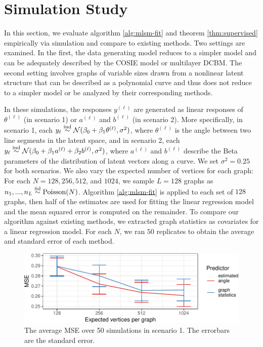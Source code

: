 \documentclass[12pt]{article}
\begin{document}
\section{Simulation Study}\label{simulation-study}

In this section, we evaluate algorithm \ref{alg:mlsm-fit} and theorem
\ref{thm:supervised} empirically via simulation and compare to existing
methods. Two settings are examined. In the first, the data generating
model reduces to a simpler model and can be adequately described by the
COSIE model or multilayer DCBM. The second setting involves graphs of
variable sizes drawn from a nonlinear latent structure that can be
described as a polynomial curve and thus does not reduce to a simpler
model or be analyzed by their corresponding methods.

In these simulations, the responses \(y^{(\ell)}\) are generated as
linear responses of \(\theta^{(\ell)}\) (in scenario 1) or
\(a^{(\ell)}\) and \(b^{(\ell)}\) (in scenario 2). More specifically, in
scenario 1, each
\(y_\ell \stackrel{\mathrm{ind}}{\sim} \mathcal{N}(\beta_0 + \beta_1 \theta^{(\ell)}, \sigma^2)\),
where \(\theta^{(\ell)}\) is the angle between two line segments in the
latent space, and in scenario 2, each
\(y_\ell \stackrel{\mathrm{ind}}{\sim} \mathcal{N}(\beta_0 + \beta_1 a^{(\ell)} + \beta_2 b^{(\ell)}, \sigma^2)\),
where \(a^{(\ell)}\) and \(b^{(\ell)}\) describe the Beta parameters of
the distribution of latent vectors along a curve. We set
\(\sigma^2 = 0.25\) for both scenarios. We also vary the expected number
of vertices for each graph: For each \(N = 128, 256, 512\), and
\(1024\), we sample \(L = 128\) graphs as
\(n_1, ..., n_L \stackrel{\mathrm{iid}}{\sim} \mathrm{Poisson}(N)\). Algorithm \ref{alg:mlsm-fit} is
applied to each set of \(128\) graphs, then half of the estimates are
used for fitting the linear regression model and the mean squared error
is computed on the remainder. To compare our algorithm against existing
methods, we extracted graph statistics as covariates for a linear
regression model. For each \(N\), we ran \(50\) replicates to obtain the
average and standard error of each method.

\begin{figure}[H]

{\centering \includegraphics{draft_files/figure-latex/angle-regression-sim-1} 

}

\caption{The average MSE over 50 simulations in scenario 1. The errorbars are the standard error.}\label{fig:angle-regression-sim}
\end{figure}
\end{document}
